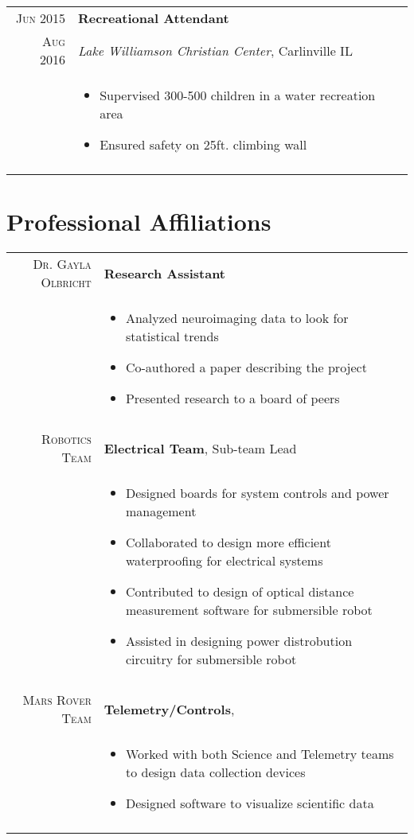 \documentclass[a4paper,10pt]{article}
\newcommand{\br}{\\\multicolumn{2}{c}{}}
\begin{document}
\begin{tabular}{r|p{15cm}}
    \textsc{Jun 2015} & \textbf{Recreational Attendant} \\
    \textsc{Aug 2016}          & \textit{Lake Williamson Christian Center}, Carlinville IL \\ &
    \begin{itemize}
    \item{Supervised 300-500 children in a water recreation area}
    \item{Ensured safety on 25ft. climbing wall}

    \end{itemize} \br\\

\end{tabular}


\section{Professional Affiliations}
\begin{tabular}{r|p{15cm}}
    \textsc{Dr. Gayla Olbricht} & \textbf{Research Assistant} \\
     & \begin{itemize}
    \item Analyzed neuroimaging data to look for statistical trends
    \item Co-authored a paper describing the project
    \item Presented research to a board of peers
    \end{itemize} \br\\

    \textsc{Robotics Team} & \textbf{Electrical Team}, Sub-team Lead \\
     & \begin{itemize}
     \item Designed boards for system controls and power management
     \item Collaborated to design more efficient waterproofing for electrical systems
     \item Contributed to design of optical distance measurement software for submersible robot
     \item Assisted in designing power distrobution circuitry for submersible robot
    \end{itemize} \br\\

    \textsc{Mars Rover Team} & \textbf{Telemetry/Controls}, \\
     & \begin{itemize}
     \item{Worked with both Science and Telemetry teams to design data collection devices}
     \item{Designed software to visualize scientific data}
     \end{itemize} \br\\


\end{tabular}
\end{document}
